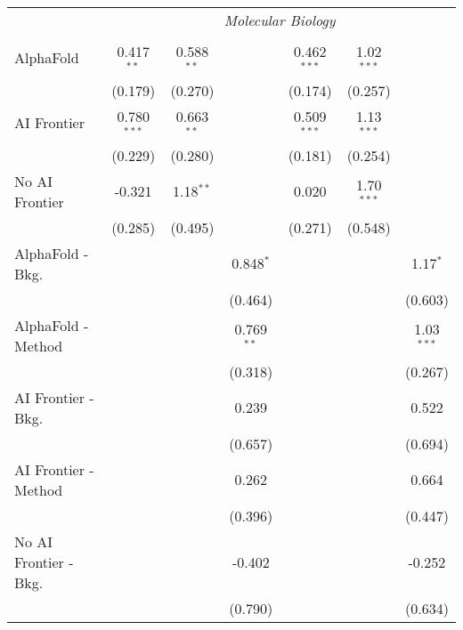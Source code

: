 \begin{tabular}{lcccccc}
 & \multicolumn{6}{c}{\textit{Molecular Biology}} \\ \\
   AlphaFold               & 0.417$^{**}$  & 0.588$^{**}$ &              & 0.462$^{***}$ & 1.02$^{***}$ &   \\   
                           & (0.179)       & (0.270)      &              & (0.174)       & (0.257)      &   \\   
   AI Frontier             & 0.780$^{***}$ & 0.663$^{**}$ &              & 0.509$^{***}$ & 1.13$^{***}$ &   \\   
                           & (0.229)       & (0.280)      &              & (0.181)       & (0.254)      &   \\   
   No AI Frontier          & -0.321        & 1.18$^{**}$  &              & 0.020         & 1.70$^{***}$ &   \\   
                           & (0.285)       & (0.495)      &              & (0.271)       & (0.548)      &   \\   
   AlphaFold - Bkg.        &               &              & 0.848$^{*}$  &               &              & 1.17$^{*}$\\   
                           &               &              & (0.464)      &               &              & (0.603)\\   
   AlphaFold - Method      &               &              & 0.769$^{**}$ &               &              & 1.03$^{***}$\\   
                           &               &              & (0.318)      &               &              & (0.267)\\   
   AI Frontier - Bkg.      &               &              & 0.239        &               &              & 0.522\\   
                           &               &              & (0.657)      &               &              & (0.694)\\   
   AI Frontier - Method    &               &              & 0.262        &               &              & 0.664\\   
                           &               &              & (0.396)      &               &              & (0.447)\\   
   No AI Frontier - Bkg.   &               &              & -0.402       &               &              & -0.252\\   
                           &               &              & (0.790)      &               &              & (0.634)\\   

\end{tabular}
